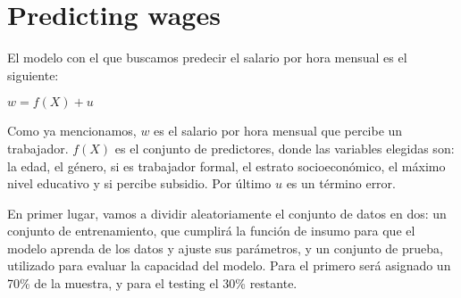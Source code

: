 \documentclass[11pt,oneside]{article}
\begin{document}
	\newpage
	
	
	
	\section{Predicting wages}
	
	El modelo con el que buscamos predecir el salario por hora mensual es el siguiente:
	
	\begin{center}
		$w = f(X) + u$
	\end{center}
	
	Como ya mencionamos, $w$ es el salario por hora mensual que percibe un trabajador. $f(X)$ es el conjunto de predictores, donde las variables elegidas son: la edad, el género, si es trabajador formal, el estrato socioeconómico, el máximo nivel educativo y si percibe subsidio. Por último $u$ es un término error.
	
	En primer lugar, vamos a dividir aleatoriamente el conjunto de datos en dos: un conjunto de entrenamiento, que cumplirá la función de insumo para que el modelo aprenda de los datos y ajuste sus parámetros, y un conjunto de prueba, utilizado para evaluar la capacidad del modelo. Para el primero será asignado un 70\% de la muestra, y para el testing el 30\% restante. 
	

	
	
	
	
	\newpage
	
	
	
	
\end{document}
